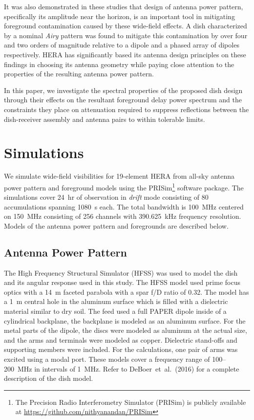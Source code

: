 \documentclass[preprint2,iop,numberedappendix,twocolappendix,appendixfloats]{emulateapj}
\begin{document}
It was also demonstrated in these studies that design of antenna power pattern, specifically its amplitude near the horizon, is an important tool in mitigating foreground contamination caused by these wide-field effects. A dish characterized by a nominal {\it Airy} pattern was found to mitigate this contamination by over four and two orders of magnitude relative to a dipole and a phased array of dipoles respectively. HERA has significantly based its antenna design principles on these findings in choosing its antenna geometry while paying close attention to the properties of the resulting antenna power pattern. 

In this paper, we investigate the spectral properties of the proposed dish design through their effects on the resultant foreground delay power spectrum and the constraints they place on attenuation required to suppress reflections between the dish-receiver assembly and antenna pairs to within tolerable limits. 

\section{Simulations}\label{sec:sim}

We simulate wide-field visibilities for 19-element HERA from all-sky antenna power pattern and foreground models using the PRISim\footnote{The Precision Radio Interferometry Simulator (PRISim) is publicly available at \url{https://github.com/nithyanandan/PRISim}} software package. The simulations cover 24~hr of observation in {\it drift} mode consisting of 80 accumulations spanning 1080~s each. The total bandwidth is 100~MHz centered on 150~MHz consisting of 256 channels with 390.625~kHz frequency resolution. Models of the antenna power pattern and foregrounds are described below.

\subsection{Antenna Power Pattern}\label{sec:beam-model}

The High Frequency Structural Simulator (HFSS) was used to model the dish and its angular response used in this study. The HFSS model used prime focus optics with a 14~m faceted parabola with a spar f/D ratio of 0.32.  The model has a 1~m central hole in the aluminum surface which is filled with a dielectric material similar to dry soil. The feed used a full PAPER dipole inside of a cylindrical backplane, the backplane is modeled as an aluminum surface. For the metal parts of the dipole, the discs were modeled as aluminum at the actual size, and the arms and terminals were modeled as copper. Dielectric stand-offs and supporting members were included. For the calculations, one pair of arms was excited using a modal port. These models cover a frequency range of 100--200~MHz in intervals of 1~MHz. Refer to DeBoer~et~al.~(2016) for a complete description of the dish model. 
\end{document}
